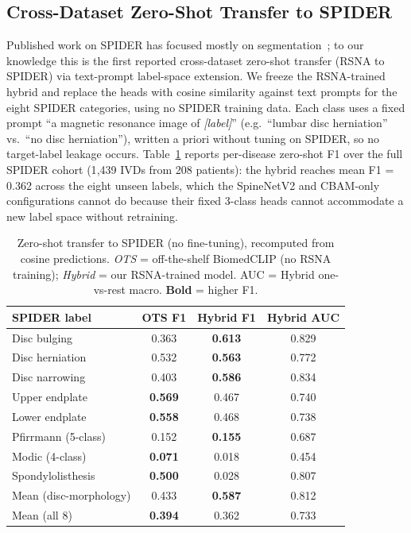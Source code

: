 \documentclass[runningheads]{llncs}
\newcommand{\best}[1]{\textcolor{best}{\textbf{#1}}}
\begin{document}
\subsection{Cross-Dataset Zero-Shot Transfer to SPIDER}

Published work on SPIDER has focused mostly on segmentation~\cite{vandergraaf2024spider}; to our knowledge this is the first reported cross-dataset zero-shot transfer (RSNA to SPIDER) via text-prompt label-space extension. We freeze the RSNA-trained hybrid and replace the heads with cosine similarity against text prompts for the eight SPIDER categories, using no SPIDER training data. Each class uses a fixed prompt ``a magnetic resonance image of \emph{[label]}'' (e.g.\ ``lumbar disc herniation'' vs.\ ``no disc herniation''), written a priori without tuning on SPIDER, so no target-label leakage occurs. Table~\ref{tab:spider} reports per-disease zero-shot F1 over the full SPIDER cohort (1{,}439 IVDs from 208 patients): the hybrid reaches mean F1 = 0.362 across the eight unseen labels, which the SpineNetV2 and CBAM-only configurations cannot do because their fixed 3-class heads cannot accommodate a new label space without retraining.

\begin{table}[t]
\centering
\caption{Zero-shot transfer to SPIDER (no fine-tuning), recomputed from cosine predictions. \emph{OTS} = off-the-shelf BiomedCLIP (no RSNA training); \emph{Hybrid} = our RSNA-trained model. AUC = Hybrid one-vs-rest macro. \textbf{Bold} = higher F1.}
\label{tab:spider}
\begin{tabular}{@{}lccc@{}}
\toprule
SPIDER label              & OTS F1 & Hybrid F1 & Hybrid AUC \\
\midrule
Disc bulging              & 0.363 & \best{0.613} & 0.829 \\
Disc herniation           & 0.532 & \best{0.563} & 0.772 \\
Disc narrowing            & 0.403 & \best{0.586} & 0.834 \\
\midrule
Upper endplate            & \best{0.569} & 0.467 & 0.740 \\
Lower endplate            & \best{0.558} & 0.468 & 0.738 \\
Pfirrmann (5-class)       & 0.152 & \best{0.155} & 0.687 \\
Modic (4-class)           & \best{0.071} & 0.018 & 0.454 \\
Spondylolisthesis         & \best{0.500} & 0.028 & 0.807 \\
\midrule
Mean (disc-morphology)    & 0.433 & \best{0.587} & 0.812 \\
Mean (all 8)              & \best{0.394} & 0.362 & 0.733 \\
\bottomrule
\end{tabular}
\end{table}
\end{document}
